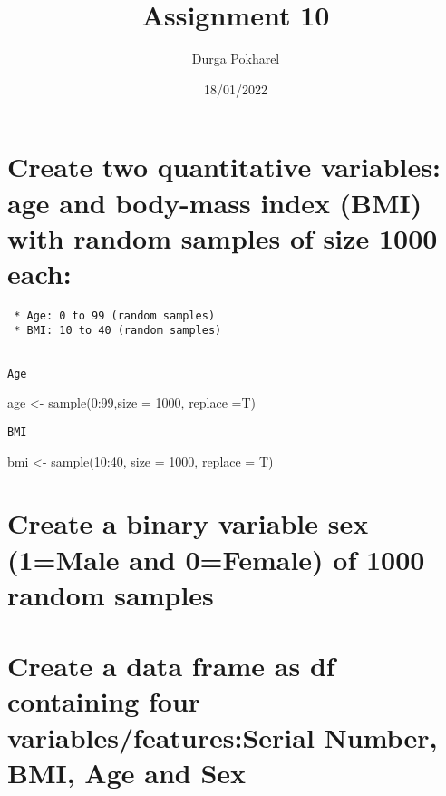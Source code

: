\documentclass[
]{article}
\title{Assignment 10}
\author{Durga Pokharel}
\date{18/01/2022}
\newenvironment{Shaded}{\begin{snugshade}}{\end{snugshade}}
\newcommand{\AttributeTok}[1]{\textcolor[rgb]{0.77,0.63,0.00}{#1}}
\newcommand{\DecValTok}[1]{\textcolor[rgb]{0.00,0.00,0.81}{#1}}
\newcommand{\FunctionTok}[1]{\textcolor[rgb]{0.00,0.00,0.00}{#1}}
\newcommand{\NormalTok}[1]{#1}
\newcommand{\OtherTok}[1]{\textcolor[rgb]{0.56,0.35,0.01}{#1}}
\newcommand{\SpecialCharTok}[1]{\textcolor[rgb]{0.00,0.00,0.00}{#1}}
\begin{document}
\maketitle

\hypertarget{create-two-quantitative-variables-age-and-body-mass-index-bmi-with-random-samples-of-size-1000-each}{%
\section{Create two quantitative variables: age and body-mass index
(BMI) with random samples of size 1000
each:}\label{create-two-quantitative-variables-age-and-body-mass-index-bmi-with-random-samples-of-size-1000-each}}

\begin{verbatim}
 * Age: 0 to 99 (random samples)
 * BMI: 10 to 40 (random samples)
 
\end{verbatim}

\texttt{Age}

\begin{Shaded}
\begin{Highlighting}[]
\NormalTok{age }\OtherTok{\textless{}{-}} \FunctionTok{sample}\NormalTok{(}\DecValTok{0}\SpecialCharTok{:}\DecValTok{99}\NormalTok{,}\AttributeTok{size =} \DecValTok{1000}\NormalTok{, }\AttributeTok{replace =}\NormalTok{T)}
\end{Highlighting}
\end{Shaded}

\texttt{BMI}

\begin{Shaded}
\begin{Highlighting}[]
\NormalTok{bmi }\OtherTok{\textless{}{-}} \FunctionTok{sample}\NormalTok{(}\DecValTok{10}\SpecialCharTok{:}\DecValTok{40}\NormalTok{, }\AttributeTok{size =} \DecValTok{1000}\NormalTok{, }\AttributeTok{replace =}\NormalTok{ T)}
\end{Highlighting}
\end{Shaded}

\hypertarget{create-a-binary-variable-sex-1male-and-0female-of-1000-random-samples}{%
\section{Create a binary variable sex (1=Male and 0=Female) of 1000
random
samples}\label{create-a-binary-variable-sex-1male-and-0female-of-1000-random-samples}}

\hypertarget{create-a-data-frame-as-df-containing-four-variablesfeaturesserial-number-bmi-age-and-sex}{%
\section{Create a data frame as df containing four
variables/features:Serial Number, BMI, Age and
Sex}\label{create-a-data-frame-as-df-containing-four-variablesfeaturesserial-number-bmi-age-and-sex}}
\end{document}
